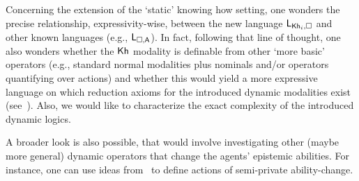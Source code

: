\begin{mrevised}
Concerning the extension of the `static' knowing how setting, one wonders the precise relationship, expressivity-wise, between the new language $\mathsf{L}_{{\sf Kh}_i,\square}$ and other known languages (e.g., $\mathsf{L}_{\square,{\sf A}}$). In fact, following that line of thought, one also wonders whether the ${\sf Kh}$ modality is definable from other `more basic' operators (e.g., standard normal modalities plus nominals and/or operators quantifying over actions) and whether this would yield a more expressive language on which reduction axioms for the introduced dynamic modalities exist (see~\cite{BenthemMZ2022}). Also, we would like to characterize the exact complexity of the introduced dynamic logics.

A broader look is also possible, that would involve investigating other (maybe more general) dynamic operators that change the agents' epistemic abilities. For instance, one can use ideas from~\cite{BaltagMS98,GalimullinA22} to define actions of semi-private ability-change. 
\end{mrevised}
 
